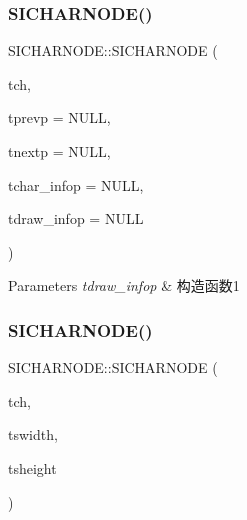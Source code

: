 \subsubsection{\texorpdfstring{S\+I\+C\+H\+A\+R\+N\+O\+D\+E()}{SICHARNODE()}\hspace{0.1cm}{\footnotesize\ttfamily [1/2]}}
{\footnotesize\ttfamily S\+I\+C\+H\+A\+R\+N\+O\+D\+E\+::\+S\+I\+C\+H\+A\+R\+N\+O\+DE (\begin{DoxyParamCaption}\item[{S\+I\+C\+H\+A\+R\+\_\+T}]{tch,  }\item[{\hyperlink{class_s_i_c_h_a_r_n_o_d_e}{S\+I\+C\+H\+A\+R\+N\+O\+DE} $\ast$}]{tprevp = {\ttfamily NULL},  }\item[{\hyperlink{class_s_i_c_h_a_r_n_o_d_e}{S\+I\+C\+H\+A\+R\+N\+O\+DE} $\ast$}]{tnextp = {\ttfamily NULL},  }\item[{\hyperlink{class_s_i_c_h_a_r___i_n_f_o}{S\+I\+C\+H\+A\+R\+\_\+\+I\+N\+F\+O\+\_\+P}}]{tchar\+\_\+infop = {\ttfamily NULL},  }\item[{\hyperlink{class_s_i_d_r_a_w___i_n_f_o}{S\+I\+D\+R\+A\+W\+\_\+\+I\+N\+F\+O\+\_\+P}}]{tdraw\+\_\+infop = {\ttfamily NULL} }\end{DoxyParamCaption})\hspace{0.3cm}{\ttfamily [inline]}}


\begin{DoxyParams}{Parameters}
{\em tdraw\+\_\+infop} & 构造函数1 \\
\hline
\end{DoxyParams}
\mbox{\label{class_s_i_c_h_a_r_n_o_d_e_aa06366dc16bf0aab9d16aaf43be0f8a3}} 
\subsubsection{\texorpdfstring{S\+I\+C\+H\+A\+R\+N\+O\+D\+E()}{SICHARNODE()}\hspace{0.1cm}{\footnotesize\ttfamily [2/2]}}
{\footnotesize\ttfamily S\+I\+C\+H\+A\+R\+N\+O\+D\+E\+::\+S\+I\+C\+H\+A\+R\+N\+O\+DE (\begin{DoxyParamCaption}\item[{S\+I\+C\+H\+A\+R\+\_\+T}]{tch,  }\item[{int}]{tswidth,  }\item[{int}]{tsheight }\end{DoxyParamCaption})\hspace{0.3cm}{\ttfamily [inline]}}


